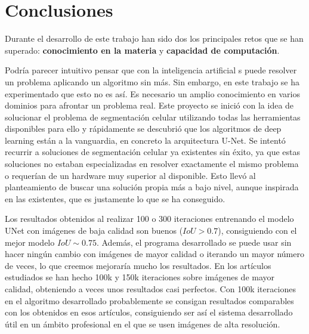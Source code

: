 \chapter{Conclusiones}\label{pruebas}

Durante el desarrollo de este trabajo han sido dos los principales retos que se han superado: \textbf{conocimiento en la materia} y \textbf{capacidad de computación}.

Podría parecer intuitivo pensar que con la inteligencia artificial s puede resolver un problema aplicando un algoritmo sin más. Sin embargo, en este trabajo se ha experimentado que esto no es así. Es necesario un amplio conocimiento en varios dominios para afrontar un problema real. Este proyecto se inició con la idea de solucionar el problema de segmentación celular utilizando todas las herramientas disponibles para ello y rápidamente se descubrió que los algoritmos de deep learning están a la vanguardia, en concreto la arquitectura U-Net. Se intentó recurrir a soluciones de segmentación celular ya existentes sin éxito, ya que estas soluciones no estaban especializadas en resolver exactamente el mismo problema o requerían de un hardware muy superior al disponible. Esto llevó al planteamiento de buscar una solución propia más a bajo nivel, aunque inspirada en las existentes, que es justamente lo que se ha conseguido.

Los resultados obtenidos al realizar 100 o 300 iteraciones entrenando el modelo UNet con imágenes de baja calidad son buenos ($IoU>0.7$), consiguiendo con el mejor modelo $IoU\sim0.75$. Además, el programa desarrollado se puede usar sin hacer ningún cambio con imágenes de mayor calidad o iterando un mayor número de veces, lo que creemos mejoraría mucho los resultados. En los artículos estudiados se han hecho 100k y 150k iteraciones sobre imágenes de mayor calidad, obteniendo a veces unos resultados casi perfectos. Con 100k iteraciones en el algoritmo desarrollado probablemente se consigan resultados comparables con los obtenidos en esos artículos, consiguiendo ser así el sistema desarrollado útil en un ámbito profesional en el que se usen imágenes de alta resolución.

